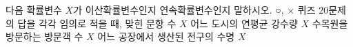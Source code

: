 다음 확률변수 $X$가 이산확률변수인지 연속확률변수인지 말하시오.
 ○, × 퀴즈 $20$문제의 답을 각각 임의로 적을 때, 맞힌 문항 수 $X$
 어느 도시의 연평균 강수량 $X$
 수목원을 방문하는 방문객 수 $X$
 어느 공장에서 생산된 전구의 수명 $X$
